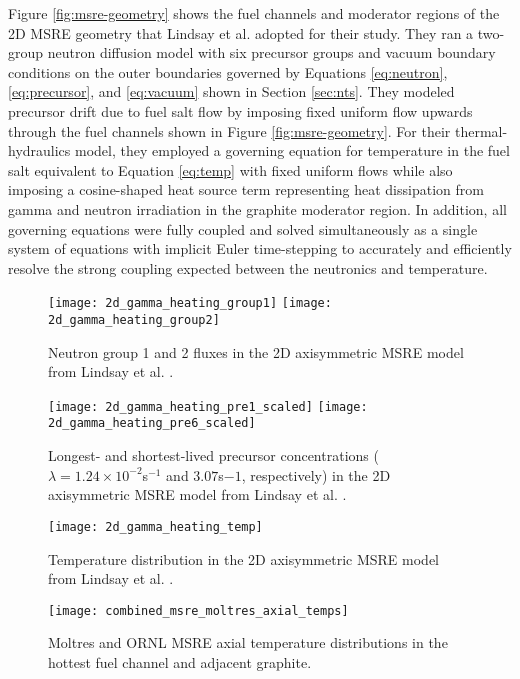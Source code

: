 Figure \ref{fig:msre-geometry} shows the fuel channels and moderator regions of
the 2D \gls{MSRE} geometry that Lindsay et al. adopted for their study.
They ran a two-group neutron diffusion model with six precursor groups and
vacuum boundary conditions on the outer boundaries governed by Equations
\ref{eq:neutron}, \ref{eq:precursor}, and \ref{eq:vacuum} shown in Section
\ref{sec:nts}. They modeled precursor drift due to fuel salt flow by imposing
fixed uniform flow upwards through the fuel channels shown in Figure
\ref{fig:msre-geometry}. For their thermal-hydraulics model, they employed a
governing equation for temperature in the fuel salt equivalent to Equation
\ref{eq:temp} with fixed uniform flows while also imposing a cosine-shaped heat
source term representing heat dissipation from gamma and neutron irradiation in
the graphite moderator region. In addition, all governing equations were fully
coupled and solved simultaneously as a single system of equations with implicit
Euler time-stepping to accurately and efficiently resolve the strong coupling
expected between the neutronics and temperature.

\begin{figure}[htb!]
	\centering
	\texttt{[image: 2d\_gamma\_heating\_group1]}
	\texttt{[image: 2d\_gamma\_heating\_group2]}
	\caption{Neutron group 1 and 2 fluxes in the 2D axisymmetric \gls{MSRE}
	model from Lindsay et al. \cite{lindsay_introduction_2018}.}
	\label{fig:msre-flux}
\end{figure}

\begin{figure}[htb!]
	\centering
	\texttt{[image: 2d\_gamma\_heating\_pre1\_scaled]}
	\texttt{[image: 2d\_gamma\_heating\_pre6\_scaled]}
	\caption{Longest- and shortest-lived precursor concentrations ($\lambda =
	1.24\times 10^{-2}$s$^{-1}$ and $3.07$s${-1}$, respectively) in the 2D
	axisymmetric \gls{MSRE} model from Lindsay et al.
	\cite{lindsay_introduction_2018}.}
	\label{fig:msre-precursor}
\end{figure}

\begin{figure}[htb!]
	\centering
	\begin{minipage}[b]{0.45\columnwidth}
	    \texttt{[image: 2d\_gamma\_heating\_temp]}
	    \caption{Temperature distribution in the 2D
	    axisymmetric \gls{MSRE} model from Lindsay et al.
	    \cite{lindsay_introduction_2018}.}
	    \label{fig:msre-temp}
	\end{minipage}
	\hfill
	\begin{minipage}[b]{0.45\columnwidth}
	    \texttt{[image: combined\_msre\_moltres\_axial\_temps]}
	    \caption{Moltres \cite{lindsay_introduction_2018} and \gls{ORNL}
	    \gls{MSRE} \cite{briggs_molten-salt_1964} axial temperature
	    distributions in the hottest fuel channel and adjacent graphite.}
	    \label{fig:msre-temp-plot}
	\end{minipage}
\end{figure}

